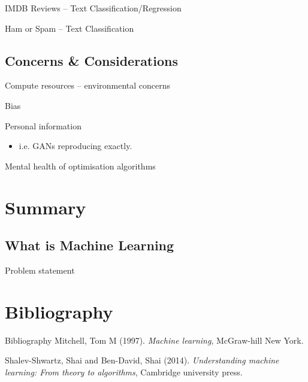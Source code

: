 \documentclass[10pt]{beamer}
\begin{document}
\begin{frame}[label={sec:org7938f01}]{IMDB Reviews -- Text Classification/Regression}
\end{frame}

\begin{frame}[label={sec:orgaca0941}]{Ham or Spam -- Text Classification}
\end{frame}

\subsection*{Concerns \& Considerations}
\label{sec:org9adece7}

\begin{frame}[label={sec:org459a2fa}]{Compute resources -- environmental concerns}
\end{frame}

\begin{frame}[label={sec:orgc2dcdb4}]{Bias}
\end{frame}

\begin{frame}[label={sec:org228022f}]{Personal information}
\begin{itemize}
\item i.e. GANs reproducing exactly.
\end{itemize}
\end{frame}

\begin{frame}[label={sec:orgc8c2f52}]{Mental health of optimisation algorithms}
\end{frame}

\section*{Summary}
\label{sec:orge3b6472}

\subsection*{What is Machine Learning}
\label{sec:org5808e83}

\begin{frame}[label={sec:orga3eefa4}]{Problem statement}
\end{frame}

\section*{Bibliography}
\label{sec:org61e2e72}

\begin{frame}[label={sec:org09895c0}]{Bibliography}
\noindent
Mitchell, Tom M (1997). \emph{Machine learning}, McGraw-hill New York.

\noindent
Shalev-Shwartz, Shai and Ben-David, Shai (2014). \emph{Understanding machine learning: From theory to algorithms}, Cambridge university press.
\end{frame}
\end{document}
